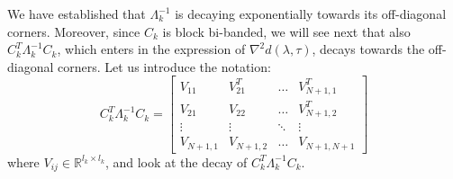 We have established that $\Lambda_k^{-1}$ is decaying exponentially towards its off-diagonal corners. Moreover, since $C_k$ is block bi-banded, we will see next that also $C_k^T \Lambda_k^{-1} C_k$, which enters in the expression of $\nabla^2 d(\lambda, \tau)$, decays towards the off-diagonal corners. Let us introduce the notation:
\begin{equation}
C_k^T \Lambda_k^{-1} C_k = \left[ \begin{array}{cccc}
V_{11} & V_{21}^T & \hdots & V_{N+1,1}^T \\
V_{21} & V_{22} & \hdots & V_{N+1,2}^T \\
\vdots & \vdots  & \ddots & \vdots \\
V_{N+1,1} & V_{N+1,2} & \hdots & V_{N+1,N+1}
\end{array} \right]
\end{equation}
where $V_{ij} \in \mathbb{R}^{l_{k} \times l_{k}}$, and look at the decay of $C_k^T \Lambda_k^{-1} C_k$.


